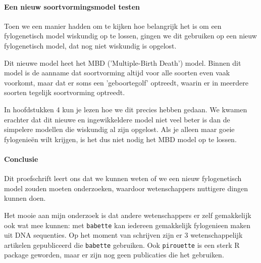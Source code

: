 {\paragraph{Een nieuw soortvormingsmodel testen}

Toen we een manier hadden om te kijken hoe belangrijk het is om
een fylogenetisch model wiskundig op te lossen, gingen
we dit gebruiken op een nieuw fylogenetisch model,
dat nog niet wiskundig is opgelost.

Dit nieuwe model heet het MBD ('Multiple-Birth Death') model.
Binnen dit model is de aanname dat soortvorming altijd voor
alle soorten even vaak voorkomt, maar dat er soms een 
'geboortegolf' optreedt, waarin er in meerdere soorten tegelijk 
soortvorming optreedt. 

In hoofdstukken 4 kun je lezen hoe we dit precies hebben gedaan.
We kwamen erachter dat dit nieuwe en ingewikkeldere model
niet veel beter is dan de simpelere modellen die wiskundig al
zijn opgelost. Als je alleen maar goeie fylogenieën wilt krijgen,
is het dus niet nodig het MBD model op te lossen.

\paragraph{Conclusie}

Dit proefschrift leert ons dat we kunnen weten of we een nieuw fylogenetisch
model zouden moeten onderzoeken, waardoor wetenschappers 
nuttigere dingen kunnen doen.

Het mooie aan mijn onderzoek is dat andere wetenschappers er zelf gemakkelijk 
ook wat mee kunnen:
met \verb;babette; kan iedereen gemakkelijk fylogenieen maken uit DNA
sequenties. Op het moment van schrijven zijn er 3 wetenschappelijk artikelen
gepubliceerd die \verb;babette; gebruiken.
Ook \verb;pirouette; is een sterk R package geworden, maar er zijn
nog geen publicaties die het gebruiken.

} %
